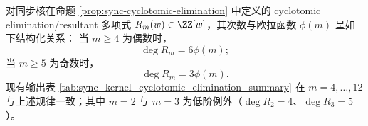 \begin{conjecture}\label{conj:sync-cyclotomic-elimination-degree-law}
对同步核在命题 \ref{prop:sync-cyclotomic-elimination} 中定义的 cyclotomic elimination/resultant 多项式
\(R_m(w)\in\ZZ[w]\)，其次数与欧拉函数 \(\phi(m)\) 呈如下结构化关系：
当 \(m\ge 4\) 为偶数时，
\[
\deg R_m=6\phi(m);
\]
当 \(m\ge 5\) 为奇数时，
\[
\deg R_m=3\phi(m).
\]
现有输出表 \ref{tab:sync_kernel_cyclotomic_elimination_summary} 在 \(m=4,\dots,12\) 与上述规律一致；其中 \(m=2\) 与 \(m=3\) 为低阶例外（\(\deg R_2=4\)、\(\deg R_3=5\)）。
\end{conjecture}
